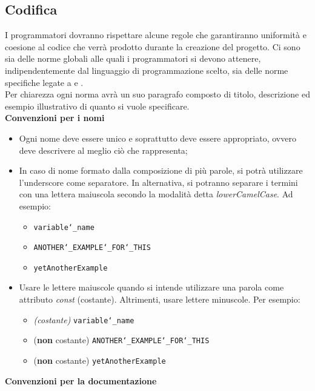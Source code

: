 \subsection{Codifica}
\label{sec:codifica}
I programmatori dovranno rispettare alcune regole che garantiranno uniformità e coesione al codice che verrà prodotto durante la creazione del progetto. Ci sono sia delle norme globali alle quali i programmatori si devono attenere, indipendentemente dal linguaggio di programmazione scelto, sia delle norme specifiche legate a  e .\\[0.5cm]
Per chiarezza ogni norma avrà un suo paragrafo composto di titolo, descrizione ed esempio illustrativo di quanto si vuole specificare.\\[0.5cm]
\textbf{Convenzioni per i nomi}
\begin{itemize}
	\item Ogni nome deve essere unico e soprattutto deve essere appropriato, ovvero deve descrivere al meglio ciò che rappresenta;
	\item In caso di nome formato dalla composizione di più parole, si potrà utilizzare l’underscore come separatore. In alternativa, si potranno separare i termini con una lettera maiuscola secondo la modalità detta \textit{lowerCamelCase}. Ad esempio:
	\begin{itemize}
		\item \texttt{variable\char`_name}
		\item \texttt{ANOTHER\char`_EXAMPLE\char`_FOR\char`_THIS}
		\item \texttt{yetAnotherExample}
	\end{itemize}
	\item Usare le lettere maiuscole quando si intende utilizzare una parola come attributo \emph{const} (costante). Altrimenti, usare lettere minuscole. Per esempio:
	\begin{itemize}
		\item \emph{(costante)} \texttt{variable\char`_name}
		\item (\textbf{non} costante) \texttt{ANOTHER\char`_EXAMPLE\char`_FOR\char`_THIS}
		\item (\textbf{non} costante) \texttt{yetAnotherExample}
	\end{itemize}
\end{itemize}
\textbf{Convenzioni per la documentazione}
